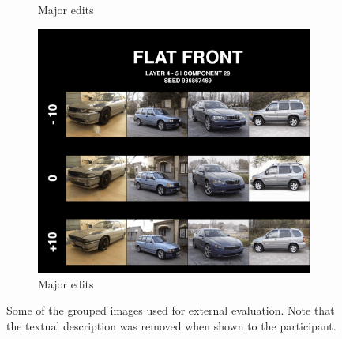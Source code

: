 \begin{figure}
\begin{subfigure}{.3\textwidth}
  \caption{Major edits}
  \label{fig:sportiness}
\end{subfigure}
\hspace{.02\textwidth}
\begin{subfigure}{.3\textwidth}
  \centering
  \includegraphics[width=\textwidth]{images/flat_front.pdf}
  \caption{Major edits}
  \label{fig:flatfront}
\end{subfigure}
\captionsetup{width=.85\linewidth}
\captionsetup{justification=centering}
\caption{Some of the grouped images used for external evaluation. Note that the textual description was removed when shown to the participant.}
\label{fig:groupedsurvey}
\end{figure}

